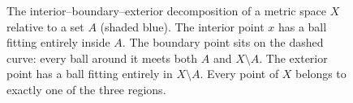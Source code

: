 \begin{figure}[h]
\caption{The interior--boundary--exterior decomposition of a metric space $X$
relative to a set $A$ (shaded blue).
The interior point $x$ has a ball fitting entirely inside $A$.
The boundary point sits on the dashed curve: every ball around it meets both $A$ and $X\setminus A$.
The exterior point has a ball fitting entirely in $X\setminus A$.
Every point of $X$ belongs to exactly one of the three regions.}
\label{fig:ibe-decomposition}
\end{figure}
